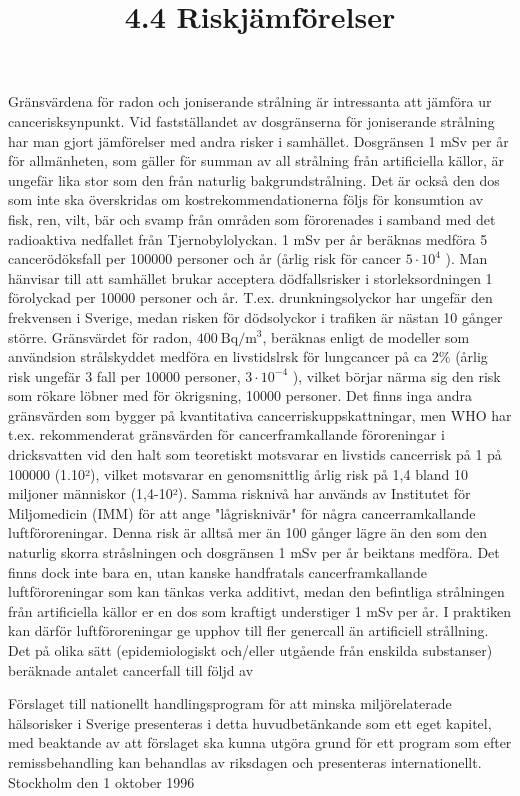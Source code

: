 \title{
4.4 Riskjämförelser
}
Gränsvärdena för radon och joniserande strålning är intressanta att jämföra ur cancerisksynpunkt. Vid fastställandet av dosgränserna för joniserande strålning har man gjort jämförelser med andra risker i samhället. Dosgränsen 1 mSv per år för allmänheten, som gäller för summan av all strålning från artificiella källor, är ungefär lika stor som den från naturlig bakgrundstrålning. Det är också den dos som inte ska överskridas om kostrekommendationerna följs för konsumtion av fisk, ren, vilt, bär och svamp från områden som förorenades i samband med det radioaktiva nedfallet från Tjernobylolyckan. 1 mSv per år beräknas medföra 5 cancerödöksfall per 100000 personer och år (årlig risk för cancer \(5 \cdot 10^{4}\) ). Man hänvisar till att samhället brukar acceptera dödfallsrisker i storleksordningen 1 förolyckad per 10000 personer och år. T.ex. drunkningsolyckor har ungefär den frekvensen i Sverige, medan risken för dödsolyckor i trafiken är nästan 10 gånger större.
Gränsvärdet för radon, \(400 \mathrm{~Bq} / \mathrm{m}^{3}\), beräknas enligt de modeller som användsion strålskyddet medföra en livstidslrsk för lungcancer på ca \(2 \%\) (årlig risk ungefär 3 fall per 10000 personer, \(3 \cdot 10^{-4}\) ), vilket börjar närma sig den risk som rökare löbner med för ökrigsning, 10000 personer.
Det finns inga andra gränsvärden som bygger på kvantitativa cancerriskuppskattningar, men WHO har t.ex. rekommenderat gränsvärden för cancerframkallande föroreningar i dricksvatten vid den halt som teoretiskt motsvarar en livstids cancerrisk på 1 på 100000 (1.10²), vilket motsvarar en genomsnittlig årlig risk på 1,4 bland 10 miljoner människor (1,4-10²). Samma risknivå har används av Institutet för Miljomedicin (IMM) för att ange "lågrisknivär" för några cancerramkallande luftföroreningar. Denna risk är alltså mer än 100 gånger lägre än den som den naturlig skorra stråslningen och dosgränsen 1 mSv per år beiktans medföra.
Det finns dock inte bara en, utan kanske handfratals cancerframkallande luftföroreningar som kan tänkas verka additivt, medan den befintliga strålningen från artificiella källor er en dos som kraftigt understiger 1 mSv per år. I praktiken kan därför luftföroreningar ge upphov till fler genercall än artificiell strållning. Det på olika sätt (epidemiologiskt och/eller utgående från enskilda substanser) beräknade antalet cancerfall till följd av

Förslaget till nationellt handlingsprogram för att minska miljörelaterade hälsorisker i Sverige presenteras i detta huvudbetänkande som ett eget kapitel, med beaktande av att förslaget ska kunna utgöra grund för ett program som efter remissbehandling kan behandlas av riksdagen och presenteras internationellt.
Stockholm den 1 oktober 1996
